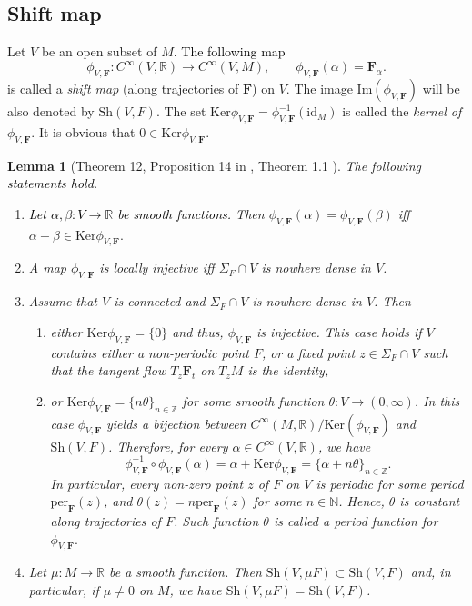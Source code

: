 \documentclass[10pt,reqno]{amsart}
\newtheorem{lemma}[subsection]{Lemma}
\newcommand{\bbR}{\mathbb{R}}
\newcommand{\bbZ}{\mathbb{Z}}
\newcommand{\bbN}{\mathbb{N}}
\newcommand{\bfF}{\mathbf{F}}
\newcommand{\id}{\mathrm{id}}
\renewcommand{\ker}{\mathrm{Ker}}
\newcommand{\textr}[1]{\textcolor{black}{#1}}
\begin{document}
\subsection{Shift map}
Let $V$ be an open subset of $M$.
\textr{The following map}
$$
\phi_{V,\bfF}:C^{\infty}(V,\bbR)\to C^{\infty}(V,M), \qquad \phi_{V,\bfF}(\alpha) = \bfF_{\alpha}.
$$
is called a {\it  shift map} (along trajectories of $\bfF$) on $V$. The image $\mathrm{Im}(\phi_{V,\bfF})$  will be also denoted by $\mathrm{Sh}(V,F).$
The set $\ker\phi_{V,\bfF} = \phi^{-1}_{V,\bfF}(\id_M)$ is called the {\it kernel of} $\phi_{V,\bfF}.$ It is obvious that $0\in\ker\phi_{V,\bfF}$.




\begin{lemma}[Theorem 12, Proposition 14 in \cite{Maksymenko:TA:2003}, Theorem 1.1 \cite{Maks:reparam-sh-map}]	\label{lm:ker-shift}
	The following \textr{statements  hold.}
\begin{enumerate}
	\item \textr{Let $\alpha, \beta:V\to \bbR$ be smooth functions.} Then  	$\phi_{V,\bfF}(\alpha) = \phi_{V,\bfF}(\beta)$ iff $\alpha-\beta\in \ker\phi_{V,\bfF}.$
	\item A map $\phi_{V,\bfF}$ is locally injective iff $\Sigma_F\cap V$ is nowhere dense in $V$.
	\item  Assume that $V$ is connected and  $\Sigma_F\cap V$ is nowhere dense in $V$.  Then 
	\begin{enumerate}[label={\rm(\roman*)}]
		\item either $\ker\phi_{V,\bfF} = \{0\}$ and thus, $\phi_{V,\bfF}$ is injective. This case holds if $V$ contains  either a non-periodic point $F$, or a fixed point $z\in \Sigma_F\cap V$ such that the tangent flow $T_z\bfF_{t}$ on $T_zM$ is the identity,
		\item or $\ker\phi_{V,\bfF} = \{n\theta\}_{n\in \bbZ}$ for some smooth  function $\theta:V\to(0,\infty)$. In this case 
		 $\phi_{V,\bfF}$ yields a bijection between $C^{\infty}(M,\bbR)/\ker(\phi_{V,\bfF})$  and $\mathrm{Sh}(V, F)$. Therefore, for every $\alpha\in C^{\infty}(V,\bbR)$, we have
		$$
		\phi_{V,\bfF}^{-1}\circ \phi_{V,\bfF}(\alpha) = \alpha+\ker\phi_{V,\bfF} = \{\alpha+n\theta\}_{n\in \bbZ}.
		$$
		In particular, every non-zero point $z$ of $F$ on $V$ is periodic for some period $\mathrm{per}_{\bfF}(z)$, and
		$\theta(z)  = n\mathrm{per}_{\bfF}(z)$ for some $n\in \bbN$. Hence,  $\theta$ is constant along trajectories of $F$. Such  function $\theta$ is  called a {\it period function} for $\phi_{V,\bfF}.$ 
	\end{enumerate}
	\item Let $\mu:M\to \bbR$ be a smooth function. Then $\mathrm{Sh}(V,\mu F)\subset \mathrm{Sh}(V, F)$ and, in particular, if $\mu\neq 0$ on $M$, we have $\mathrm{Sh}(V,\mu F) = \mathrm{Sh}(V, F)$. 
\end{enumerate}
\end{lemma}
\end{document}
